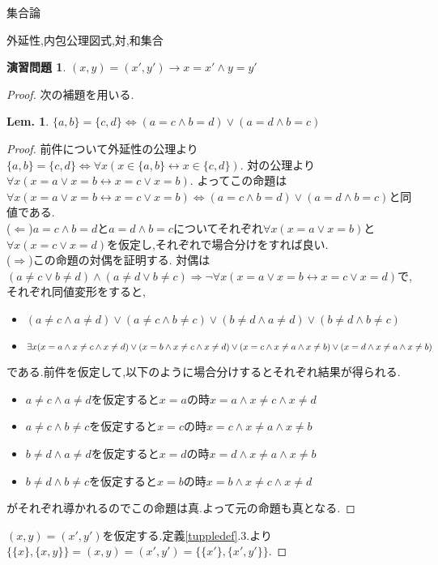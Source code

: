 \documentclass[14pt]{jsarticle}
\theoremstyle{definition}
\newtheorem{lem}[dfn]{Lem.}
\newtheorem{doril}[dfn]{演習問題}
\begin{document}
\begin{section}{集合論}
\begin{subsection}{外延性,内包公理図式,対,和集合}
\begin{doril}
\label{tuppleprop}
$(x,y)=(x',y')\to x=x' \land y=y'$
\end{doril}
\begin{proof}
次の補題を用いる.
\begin{lem}
\label{doubleseteq}
$\{a,b\}=\{c,d\}\Leftrightarrow (a=c\land b=d)\lor(a=d\land b=c)$
\end{lem}
\begin{proof}
前件について外延性の公理より$\{a,b\}=\{c,d\} \Leftrightarrow \forall x(x\in\{a,b\} \leftrightarrow x\in\{c,d\})$.
対の公理より$\forall x(x=a \lor x=b \leftrightarrow x=c \lor x=b)$.
よってこの命題は$\forall x(x=a \lor x=b \leftrightarrow x=c \lor x=b)\Leftrightarrow (a=c\land b=d)\lor(a=d\land b=c)$と同値である.\\
($\Leftarrow$)$a=c\land b=d$と$a=d \land b=c$についてそれぞれ$\forall x(x=a \lor x=b)$と$\forall x (x=c \lor x=d)$を仮定し,それぞれで場合分けをすれば良い.\\
($\Rightarrow$)この命題の対偶を証明する.
対偶は$(a\not =c \lor b\not =d) \land (a\not =d \lor b \not =c)\Rightarrow \lnot \forall x(x=a\lor x=b \leftrightarrow x=c \lor x=d)$で,それぞれ同値変形をすると,
\begin{itemize}
	\item $(a\not =c \land a\not =d)\lor (a\not =c \land b\not =c ) \lor (b\not =d \land a\not =d) \lor (b \not = d \land b \not = c)$
	\item $\exists x(x=a \land x\not =c \land x \not =d) \lor (x =b \land x\not =c \land x \not =d) \lor\\
(x=c \land x\not =a \land x\not =b)\lor(x=d \land x\not =a \land x\not =b)$
\end{itemize}
である.前件を仮定して,以下のように場合分けするとそれぞれ結果が得られる.
\begin{itemize}
	\item $a\not =c \land a\not =d$を仮定すると$x=a$の時$x=a \land x\not =c \land x\not =d$
	\item $a\not =c \land b\not =c$を仮定すると$x=c$の時$x=c\land x\not =a \land x\not =b$
	\item $b\not =d \land a\not =d$を仮定すると$x=d$の時$x=d\land x\not =a \land x\not =b$
	\item $b\not =d \land b\not =c$を仮定すると$x=b$の時$x=b\land x\not =c \land x\not =d$
\end{itemize}
がそれぞれ導かれるのでこの命題は真.よって元の命題も真となる.
\end{proof}
$(x,y)=(x',y')$を仮定する.定義\ref{tuppledef}.3.より$\{\{x\},\{x,y\}\}=(x,y)=(x',y')=\{\{x'\},\{x',y'\}\}$.

\end{proof}
\end{subsection}
\end{section}
\end{document}
